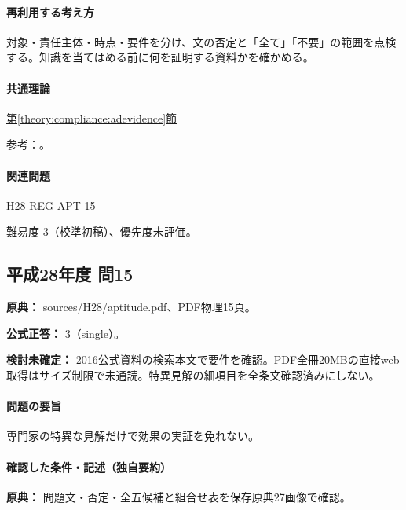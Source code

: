 \paragraph{再利用する考え方} 対象・責任主体・時点・要件を分け、文の否定と「全て」「不要」の範囲を点検する。知識を当てはめる前に何を証明する資料かを確かめる。

\paragraph{共通理論} \hyperref[theory:compliance:adevidence]{第\ref*{theory:compliance:adevidence}節}

\par 参考：\cite{saf53_ad2016,saf53_ad_overview}。

\paragraph{関連問題} \hyperref[q:h28-reg-apt-15]{H28-REG-APT-15}

\par 難易度 3（校準初稿）、優先度未評価。

\subsection{平成28年度 問15}
\label{q:h28-reg-apt-15}

\noindent\textbf{原典：} sources/H28/aptitude.pdf、PDF物理15頁。

\textbf{公式正答：} 3（single）。

\par\textbf{検討未確定：} 2016公式資料の検索本文で要件を確認。PDF全冊20MBの直接web取得はサイズ制限で未通読。特異見解の細項目を全条文確認済みにしない。

\paragraph{問題の要旨} 専門家の特異な見解だけで効果の実証を免れない。

\paragraph{確認した条件・記述（独自要約）}\mbox{}\par

\noindent\textbf{原典：} 問題文・否定・全五候補と組合せ表を保存原典27画像で確認。\par


